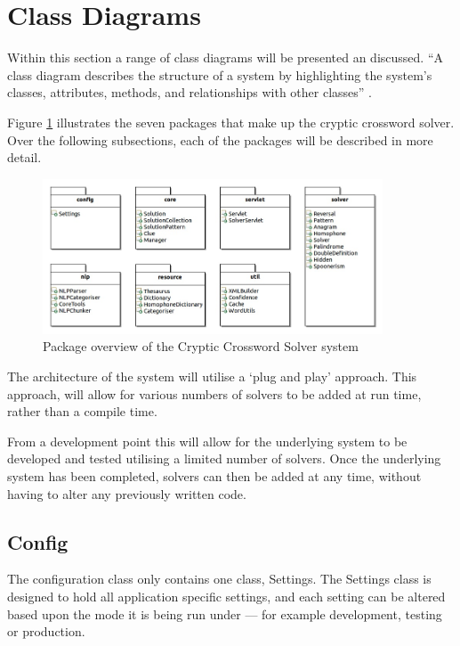 \section{Class Diagrams}
\label{sec:class_diagram}

Within this section a range of class diagrams will be presented an discussed. 
``A class diagram describes the structure of a system by highlighting the 
system's classes, attributes, methods, and relationships with other classes''
\citep{lunn03}.

Figure \ref{fig:package_overview} illustrates the seven packages that make up 
the cryptic crossword solver. Over the following subsections, each of the 
packages will be described in more detail.

\begin{figure}[H]
  \centering
  \includegraphics[width=0.9\textwidth]{design/class/package_layout.jpg}
  \caption{Package overview of the Cryptic Crossword Solver system}
  \label{fig:package_overview}
\end{figure}

The architecture of the system will utilise a `plug and play' approach. This 
approach, will allow for various numbers of solvers to be added at run time, 
rather than a compile time.

From a development point this will allow for the underlying system to be 
developed and tested utilising a limited number of solvers. Once the underlying 
system has been completed, solvers can then be added at any time, without having 
to alter any previously written code.


\subsection{Config}
\label{sub:config}

The configuration class only contains one class, Settings. The Settings class is 
designed to hold all application specific settings, and each setting can be 
altered based upon the mode it is being run under --- for example development, 
testing or production.

